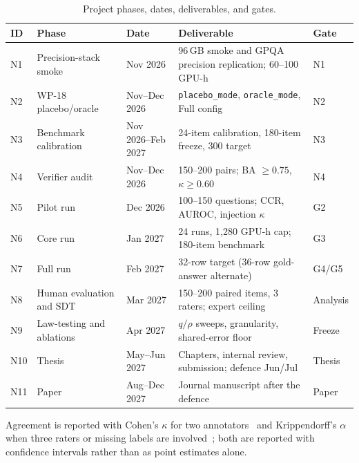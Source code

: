 \begin{table}[H]
  \centering
  \caption{Project phases, dates, deliverables, and gates.}
  \renewcommand{\arraystretch}{1.25}
  \small
  \begin{tabular}{|p{}|p{}|p{}|p{}|p{}|}
    \hline
    ID & Phase & Date & Deliverable & Gate \\
    \hline
    N1 & Precision-stack smoke & Nov 2026 & 96\,GB smoke and GPQA precision replication; 60--100 GPU-h & N1 \\
    \hline
    N2 & WP-18 placebo/oracle & Nov--Dec 2026 & \texttt{placebo\_mode}, \texttt{oracle\_mode}, Full config & N2 \\
    \hline
    N3 & Benchmark calibration & Nov 2026--Feb 2027 & 24-item calibration, 180-item freeze, 300 target & N3 \\
    \hline
    N4 & Verifier audit & Nov--Dec 2026 & 150--200 pairs; BA $\ge0.75$, $\kappa\ge0.60$ & N4 \\
    \hline
    N5 & Pilot run & Dec 2026 & 100--150 questions; CCR, AUROC, injection $\kappa$ & G2 \\
    \hline
    N6 & Core run & Jan 2027 & 24 runs, 1{,}280 GPU-h cap; 180-item benchmark & G3 \\
    \hline
    N7 & Full run & Feb 2027 & 32-row target (36-row gold-answer alternate) & G4/G5 \\
    \hline
    N8 & Human evaluation and SDT & Mar 2027 & 150--200 paired items, 3 raters; expert ceiling & Analysis \\
    \hline
    N9 & Law-testing and ablations & Apr 2027 & $q/\rho$ sweeps, granularity, shared-error floor & Freeze \\
    \hline
    N10 & Thesis & May--Jun 2027 & Chapters, internal review, submission; defence Jun/Jul & Thesis \\
    \hline
    N11 & Paper & Aug--Dec 2027 & Journal manuscript after the defence & Paper \\
    \hline
  \end{tabular}
  \label{tab:phases}
\end{table}

Agreement is reported with Cohen's $\kappa$ for two annotators~\cite{cohen1960coefficient} and Krippendorff's $\alpha$ when three raters or missing labels are involved~\cite{krippendorff2004reliability}; both are reported with confidence intervals rather than as point estimates alone.


